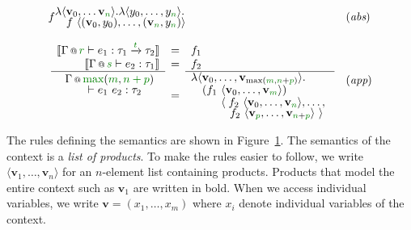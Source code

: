 \begin{figure}[t]
\begin{equation*}
\begin{array}{ll}
  {f}
  {\hspace{-0.5em}\begin{array}{l}
  \lambda \langle \mathbf{v}_0, \ldots \mathbf{v}_{\cclrd{n}} \rangle . \lambda \langle y_0, \ldots, y_{\cclrd{n}}\rangle .\\[-0.25em]
  \quad f~\langle (\mathbf{v}_0, y_0), \ldots, (\mathbf{v}_{ \cclrd{n}  }, y_{ \cclrd{n} } ) \rangle
  \end{array}\hspace{-1em}~}
& (\emph{abs})
\\[1.5em]
\hspace{0.25em}\emdefff
  {\coctx{\Gamma}{\cclrd{r}} \vdash e_1 : \tau_1 \xrightarrow{\cclrd{t}} \tau_2}
  {\coctx{\Gamma}{\cclrd{s}} \vdash e_2 : \tau_1}
  {\begin{array}{l}\coctx{\Gamma}{\cclrd{\textnormal{max}}(\cclrd{m}, \cclrd{n+p})} \\[-0.25em]\qquad \vdash e_1~e_2 : \tau_2\\[-0.25em]~\\[-0.25em]~\end{array}}
  {f_1}
  {f_2}
  {\hspace{-0.5em}\begin{array}{l}
  \lambda \langle\mathbf{v}_0, \ldots, \mathbf{v}_{ \textnormal{max}(\cclrd{m}, \cclrd{n}+\cclrd{p})} \rangle . \\[-0.1em]
  \quad (f_1~\langle\mathbf{v}_0, \ldots, \mathbf{v}_{ \cclrd{m} }\rangle)\\[-0.1em]
  ~~\qquad\langle\; f_2~\langle\mathbf{v}_0, \ldots, \mathbf{v}_{ \cclrd{n} }\rangle,\ldots,\\[-0.25em]
  ~~\qquad~\;\, f_2~\langle\mathbf{v}_{ \cclrd{p} }, \ldots, \mathbf{v}_{ \cclrd{n}+\cclrd{p} }\rangle~\rangle
  \end{array}\hspace{-0.5em}~}
& (\emph{app})
\\[1.5em]
\end{array}
\end{equation*}

\label{fig:applications-flat-dfsem}
\end{figure}


The rules defining the semantics are shown in Figure~\ref{fig:applications-flat-dfsem}. The
semantics of the context is a \emph{list of products}. To make the rules easier to follow, we write
$\langle \mathbf{v}_1, \ldots, \mathbf{v}_n \rangle$ for an $n$-element list containing products.
Products that model the entire context such as $\mathbf{v}_1$ are written in bold. When we access
individual variables, we write $\mathbf{v} = (x_1, \ldots, x_m)$ where $x_i$ denote individual
variables of the context.

